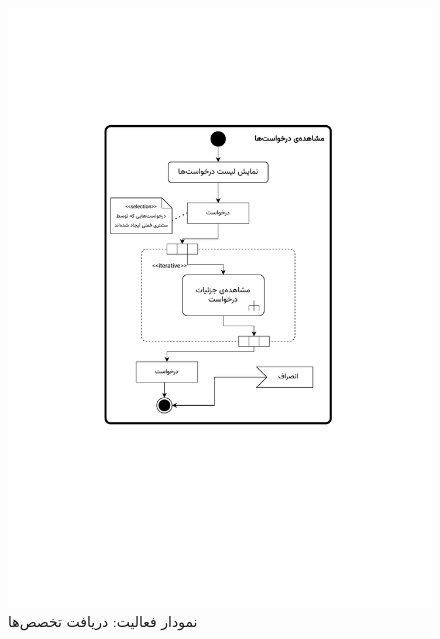 \begin{figure}[ht!]
	\centering
	\includegraphics[scale=0.8, page=10]{figs/OOD-activity11-20.pdf}
	\caption{نمودار فعالیت: دریافت تخصص‌ها}
\end{figure}
\FloatBarrier
\newpage

